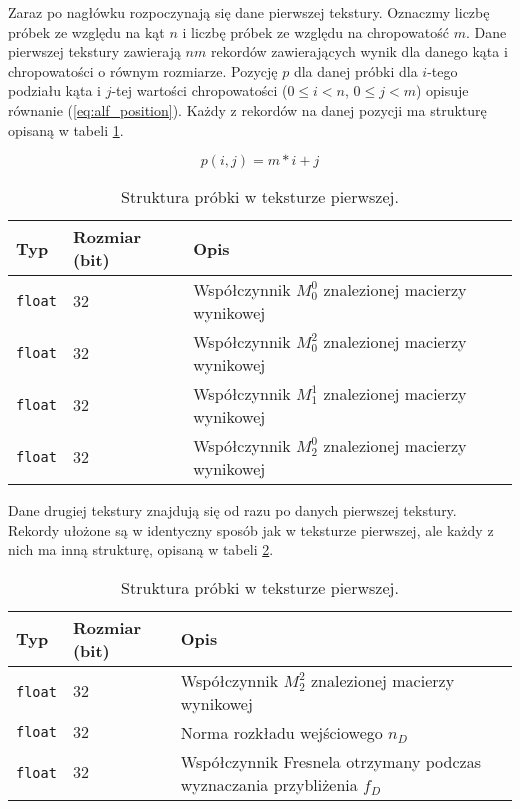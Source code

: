 \documentclass[../main.tex]{subfiles}
\begin{document}
Zaraz po nagłówku rozpoczynają się dane pierwszej tekstury. Oznaczmy liczbę próbek ze względu na kąt $n$ i liczbę próbek ze względu na chropowatość $m$. Dane pierwszej tekstury zawierają $nm$ rekordów zawierających wynik dla danego kąta i chropowatości o równym rozmiarze. Pozycję $p$ dla danej próbki dla $i$-tego podziału kąta i $j$-tej wartości chropowatości ($0 \leq i < n$, $0 \leq j < m$) opisuje równanie (\ref{eq:alf_position}). Każdy z rekordów na danej pozycji ma strukturę opisaną w tabeli \ref{tab:alf_ts1_value}.

\begin{equation}
  p(i,j) = m * i + j
  \label{eq:alf_position}
\end{equation}

\begin{table}[h]
    \centering
    \begin{tabular}{|l|l|l|}
        \hline
        Typ & Rozmiar (bit) & Opis \\ \hline 
        \texttt{float} & $32$ & Współczynnik $M_0^0$ znalezionej macierzy wynikowej \\ \hline
        \texttt{float} & $32$ & Współczynnik $M_0^2$ znalezionej macierzy wynikowej \\ \hline
        \texttt{float} & $32$ & Współczynnik $M_1^1$ znalezionej macierzy wynikowej \\ \hline
        \texttt{float} & $32$ & Współczynnik $M_2^0$ znalezionej macierzy wynikowej \\ \hline
    \end{tabular}
    \caption{Struktura próbki w teksturze pierwszej.}
    \label{tab:alf_ts1_value}
\end{table}

Dane drugiej tekstury znajdują się od razu po danych pierwszej tekstury. Rekordy ułożone są w identyczny sposób jak w teksturze pierwszej, ale każdy z nich ma inną strukturę, opisaną w tabeli \ref{tab:alf_ts2_value}.

\begin{table}[h]
    \centering
    \begin{tabular}{|l|l|l|}
        \hline
        Typ & Rozmiar (bit) & Opis \\ \hline 
        \texttt{float} & $32$ & Współczynnik $M_2^2$ znalezionej macierzy wynikowej \\ \hline
        \texttt{float} & $32$ & Norma rozkładu wejściowego $n_D$ \\ \hline
        \texttt{float} & $32$ & Współczynnik Fresnela otrzymany podczas wyznaczania przybliżenia $f_D$ \\ \hline
    \end{tabular}
    \caption{Struktura próbki w teksturze pierwszej.}
    \label{tab:alf_ts2_value}
\end{table}
\end{document}
